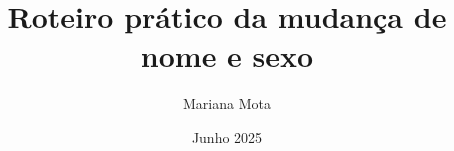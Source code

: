 \newcommand{\DocTitle}{Roteiro prático da mudança de nome e sexo}
\newcommand{\DocSubtitle}{Um guia completo para navegar a burocracia da mudança de nome e sexo em Portugal}
\newcommand{\DocAuthor}{Mariana Mota}
\newcommand{\DocRights}{Feito com <3 para o domínio público}
\newcommand{\DocDate}{Junho 2025}
\newcommand{\DocEdition}{1ª Edição - Comum}
\newcommand{\DocPublication}{Manual de instruções técnicas e práticas}
\newcommand{\DocDimensions}{A4 Standard (21×29.7 cm)}
\newcommand{\DocLanguage}{Português}
\newcommand{\DocPages}{\ztotpages}
\newcommand{\DocBanner}{imagens/banner-transgenero.png}
\newcommand{\DocHeader}{imagens/banner-arcoiris-2.png}
\newcommand{\DocFeatured}{imagens/duas-pessoas-com-fundo-psicadelico.png}

\title{\DocTitle}
\author{\DocAuthor}
\date{\DocDate}


